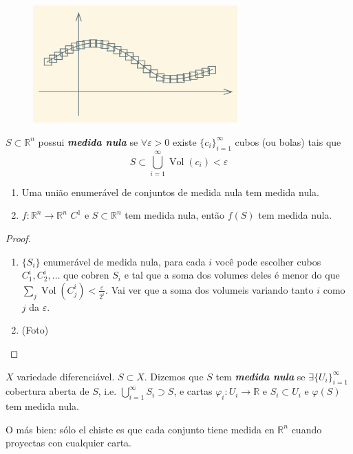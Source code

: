 \begin{defn}\leavevmode
	\begin{figure}[H]
		\centering
		\includegraphics[width=0.7\textwidth]{fig1}
	\end{figure}
\(S \subset \mathbb{R}^n\) possui \textit{\textbf{medida nula}} se \(\forall  \varepsilon >0\) existe \(\{c_i\}_{i=1}^\infty\) cubos (ou bolas) tais que \[S \subset \bigcup_{i=1}^\infty \operatorname{Vol}(c_i)<\varepsilon\]
\end{defn}

\begin{prop}\leavevmode
	\begin{enumerate}
	\item Uma união enumerável de conjuntos de medida nula tem medida nula.
	\item \(f : \mathbb{R}^n \to \mathbb{R}^n\) \(C^1\) e \(S \subset \mathbb{R}^n\) tem medida nula, então \(f(S)\) tem medida nula.
	\end{enumerate}
\end{prop}

\begin{proof}\leavevmode
\begin{enumerate}
\item \(\{S_i\}\) enumerável de medida nula, para cada $i$ você pode escolher cubos \(C^i_1,C^i_2,\ldots\) que cobren \(S_i\) e tal que a soma dos volumes deles é menor do que \(\sum_j \operatorname{Vol}(C^i_j)<\frac{\varepsilon}{2^i}\). Vai ver que a soma dos volumeis variando tanto \(i\) como \(j\) da \(\varepsilon\).

\item (Foto)
\end{enumerate}
\end{proof}

\begin{defn}\leavevmode
	\(X\) variedade diferenciável. \(S \subset X\). Dizemos que \(S\) tem \textit{\textbf{medida nula}} se \(\exists \{U_i\}_{i=1}^\infty\) cobertura aberta de \(S\), i.e. \(\bigcup_{i=1}^\infty S_i \supset S\), e cartas \(\varphi_i:U_i\to \mathbb{R}\) e \(S_i \subset U_i\) e \(\varphi(S)\) tem medida nula.

	O más bien: sólo el chiste es que cada conjunto tiene medida en \(\mathbb{R}^n\) cuando proyectas con cualquier carta.
\end{defn}

